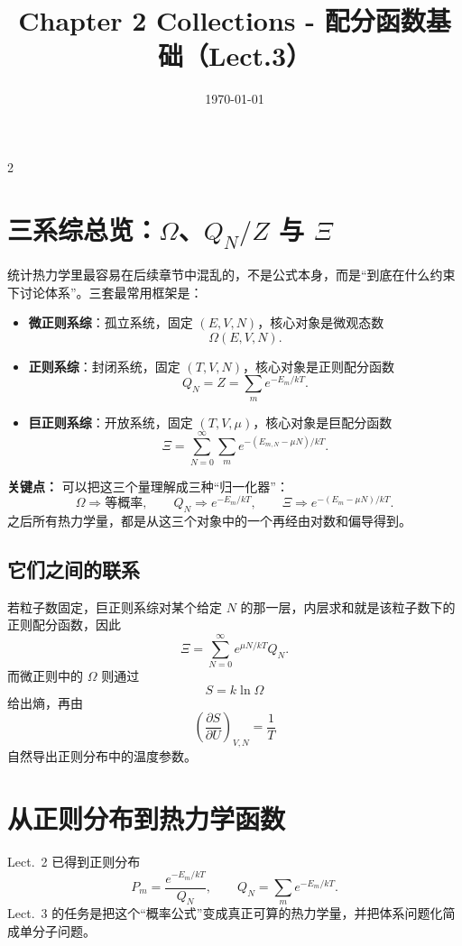 \documentclass[a4paper,9pt]{article}
\title{\vspace{-2em}\Large\bfseries\color{sectioncolor} Chapter 2 Collections - 配分函数基础（Lect.3）\vspace{-1em}}
\author{}
\date{\today}
\newenvironment{keypoint}
{\par\vspace{0.3em}\noindent\begin{tcolorbox}[
  colback=keybg,
  colframe=keycolor,
  boxrule=0.5pt,
  arc=2pt,
  left=2pt,
  right=2pt,
  top=2pt,
  bottom=2pt,
  boxsep=0pt,
  ]
\noindent\textcolor{keycolor}{\textbf{关键点：}}}
{\end{tcolorbox}\par\vspace{0.3em}}
\begin{document}
\maketitle
\thispagestyle{fancy}

\begin{multicols}{2}

\scriptsize{\tableofcontents}

\section{三系综总览：$\Omega$、$Q_N/Z$ 与 $\Xi$}

统计热力学里最容易在后续章节中混乱的，不是公式本身，而是“到底在什么约束下讨论体系”。三套最常用框架是：
\begin{itemize}
  \item \textbf{微正则系综}：孤立系统，固定 $(E,V,N)$，核心对象是微观态数
  \[
  \Omega(E,V,N).
  \]
  \item \textbf{正则系综}：封闭系统，固定 $(T,V,N)$，核心对象是正则配分函数
  \[
  Q_N=Z=\sum_m e^{-E_m/kT}.
  \]
  \item \textbf{巨正则系综}：开放系统，固定 $(T,V,\mu)$，核心对象是巨配分函数
  \[
  \Xi=\sum_{N=0}^{\infty}\sum_m e^{-(E_{m,N}-\mu N)/kT}.
  \]
\end{itemize}

\begin{keypoint}
可以把这三个量理解成三种“归一化器”：
\[
\Omega \Rightarrow \text{等概率},
\qquad
Q_N \Rightarrow e^{-E_m/kT},
\qquad
\Xi \Rightarrow e^{-(E_m-\mu N)/kT}.
\]
之后所有热力学量，都是从这三个对象中的一个再经由对数和偏导得到。
\end{keypoint}

\subsection{它们之间的联系}
若粒子数固定，巨正则系综对某个给定 $N$ 的那一层，内层求和就是该粒子数下的正则配分函数，因此
\[
\Xi=\sum_{N=0}^{\infty} e^{\mu N/kT} Q_N.
\]
而微正则中的 $\Omega$ 则通过
\[
S=k\ln\Omega
\]
给出熵，再由
\[
\left(\frac{\partial S}{\partial U}\right)_{V,N}=\frac{1}{T}
\]
自然导出正则分布中的温度参数。

	\section{从正则分布到热力学函数}

	Lect.~2 已得到正则分布
	\[
		P_m=\frac{e^{-E_m/kT}}{Q_N},
		\qquad
		Q_N=\sum_m e^{-E_m/kT}.
	\]
	Lect.~3 的任务是把这个“概率公式”变成真正可算的热力学量，并把体系问题化简成单分子问题。


\end{multicols}
\end{document}
